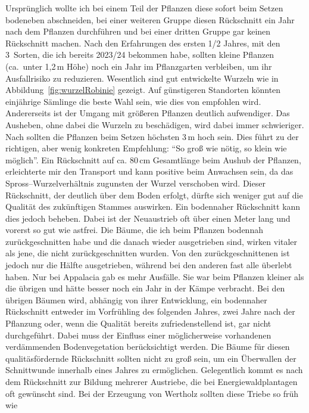 \documentclass[twocolumn]{scrartcl}
\begin{document}
Ursprünglich wollte ich bei einem Teil der Pflanzen diese sofort beim
Setzen bodeneben abschneiden, bei einer weiteren Gruppe diesen
Rückschnitt ein Jahr nach dem Pflanzen durchführen und bei einer
dritten Gruppe gar keinen Rückschnitt machen. Nach den Erfahrungen des
ersten 1/2 Jahres, mit den 3~Sorten, die ich bereits 2023/24 bekommen
habe, sollten kleine Pflanzen (ca.\ unter 1,2\,m Höhe) noch ein Jahr
im Pflanzgarten verbleiben, um ihr Ausfallrisiko zu
reduzieren. Wesentlich sind gut entwickelte Wurzeln wie in
Abbildung~\ref{fig:wurzelRobinie} gezeigt. Auf günstigeren Standorten
könnten einjährige Sämlinge die beste Wahl sein, wie dies von
\citet{ciuvat2022robinieRumaenien} empfohlen wird.  Andererseits ist
der Umgang mit größeren Pflanzen deutlich aufwendiger.  Das Ausheben,
ohne dabei die Wurzeln zu beschädigen, wird dabei immer schwieriger.
Nach \citet{fuehrer2005robinie} sollten die Pflanzen beim Setzen
höchsten 3\,m hoch sein.
Dies führt zu der richtigen, aber wenig konkreten Empfehlung:
\enquote{So groß wie nötig, so klein wie möglich}. Ein Rückschnitt
auf ca. 80\,cm Gesamtlänge beim Aushub der Pflanzen, erleichterte mir
den Transport und kann positive beim Anwachsen sein, da das
Spross--Wurzelverhältnis zugunsten der Wurzel verschoben wird.  Dieser
Rückschnitt, der deutlich über dem Boden erfolgt, dürfte sich weniger
gut auf die Qualität des zukünftigen Stammes auswirken.  Ein
bodennaher Rückschnitt kann dies jedoch beheben. Dabei ist der
Neuaustrieb oft über einen Meter lang und vorerst so gut wie astfrei.
Die Bäume, die ich beim Pflanzen bodennah zurückgeschnitten habe und
die danach wieder ausgetrieben sind, wirken vitaler als jene, die
nicht zurückgeschnitten wurden. Von den zurückgeschnittenen ist jedoch
nur die Hälfte ausgetrieben, während bei den anderen fast alle
überlebt haben. Nur bei Appalacia gab es mehr Ausfälle. Sie war beim
Pflanzen kleiner als die übrigen und hätte besser noch ein Jahr in der
Kämpe verbracht.
Bei den übrigen Bäumen wird, abhängig von ihrer Entwicklung, ein
bodennaher Rückschnitt entweder im Vorfrühling des folgenden Jahres,
zwei Jahre nach der Pflanzung oder, wenn die Qualität bereits
zufriedenstellend ist, gar nicht durchgeführt.
Dabei muss der Einfluss einer möglicherweise
vorhandenen verdämmenden Bodenvegetation berücksichtigt werden. Die
Bäume für diesen qualitäsfördernde Rückschnitt sollten nicht zu groß
sein, um ein Überwallen der Schnittwunde innerhalb eines Jahres zu
ermöglichen. Gelegentlich kommt es nach dem Rückschnitt zur Bildung
mehrerer Austriebe, die bei Energiewaldplantagen oft gewünscht sind.
Bei der Erzeugung von Wertholz sollten diese Triebe so früh wie
\end{document}
